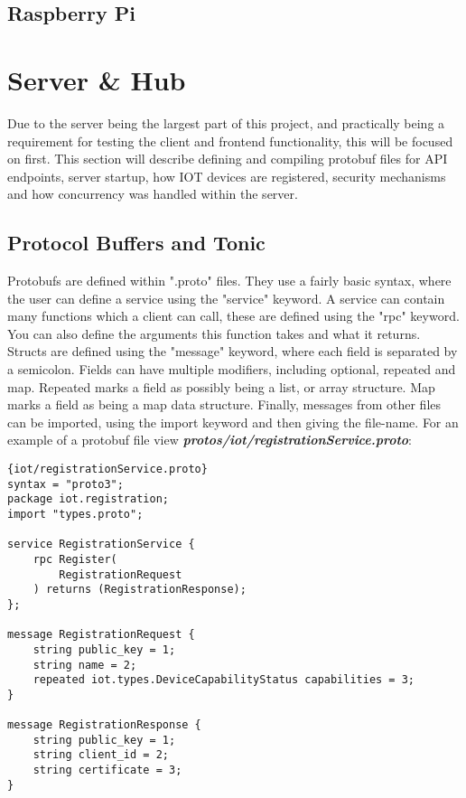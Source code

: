 \subsection{Raspberry Pi} \label{sec:chap3:technology:raspi}

\section{Server \& Hub} \label{sec:chap3:server}
Due to the server being the largest part of this project, and practically being a requirement for testing the client and frontend functionality, this will be focused on first. This section will describe defining and compiling protobuf files for API endpoints, server startup, how IOT devices are registered, security mechanisms and how concurrency was handled within the server. 

\subsection{Protocol Buffers and Tonic} \label{sec:chap3:server:protoBufs}
Protobufs are defined within ".proto" files. They use a fairly basic syntax, where the user can define a service using the "service" keyword. A service can contain many functions which a client can call, these are defined using the "rpc" keyword. You can also define the arguments this function takes and what it returns. Structs are defined using the "message" keyword, where each field is separated by a semicolon. Fields can have multiple modifiers, including optional, repeated and map. Repeated marks a field as possibly being a list, or array structure. Map marks a field as being a map data structure. Finally, messages from other files can be imported, using the import keyword and then giving the file-name. \cite{protobufDocs} For an example of a protobuf file view \textbf{\textit{protos/iot/registrationService.proto}}:

\begin{lstlisting}[language=protobuf3, style=boxed]{iot/registrationService.proto}
syntax = "proto3";
package iot.registration;
import "types.proto";

service RegistrationService {
    rpc Register(
        RegistrationRequest
    ) returns (RegistrationResponse);
};

message RegistrationRequest {
    string public_key = 1;
    string name = 2;
    repeated iot.types.DeviceCapabilityStatus capabilities = 3;
}

message RegistrationResponse {
    string public_key = 1;
    string client_id = 2;
    string certificate = 3;
}
\end{lstlisting}

